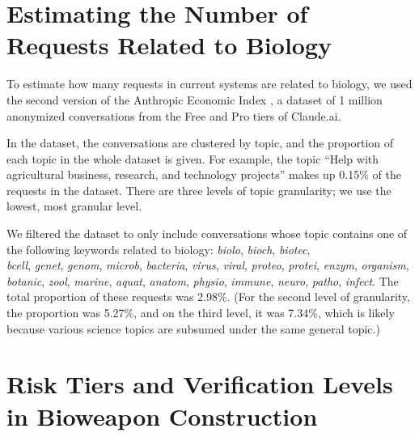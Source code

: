 \documentclass{article}
\theoremstyle{plain}
\theoremstyle{definition}
\theoremstyle{remark}
\begin{document}



\newpage
\appendix

\section{Estimating the Number of Requests Related to Biology} \label{appendix:estimating-biology-requests}

To estimate how many requests in current systems are related to biology, we used the second version of the Anthropic Economic Index \cite{handa2025economictasksperformedai}, a dataset of 1 million anonymized conversations from the Free and Pro tiers of Claude.ai.

In the dataset, the conversations are clustered by topic, and the proportion of each topic in the whole dataset is given.
For example, the topic ``Help with agricultural business, research, and technology projects'' makes up 0.15\% of the requests in the dataset.
There are three levels of topic granularity; we use the lowest, most granular level.

We filtered the dataset to only include conversations whose topic contains one of the following keywords related to biology: \emph{biolo}, \emph{bioch}, \emph{biotec}, \emph{\\bcell}, \emph{genet}, \emph{genom}, \emph{microb}, \emph{bacteria}, \emph{virus}, \emph{viral}, \emph{proteo}, \emph{protei}, \emph{enzym}, \emph{organism}, \emph{botanic}, \emph{zool}, \emph{marine}, \emph{aquat}, \emph{anatom}, \emph{physio}, \emph{immune}, \emph{neuro}, \emph{patho}, \emph{infect}.
The total proportion of these requests was 2.98\%. (For the second level of granularity, the proportion was 5.27\%, and on the third level, it was 7.34\%, which is likely because various science topics are subsumed under the same general topic.)

\section{Risk Tiers and Verification Levels in Bioweapon Construction}
\end{document}
